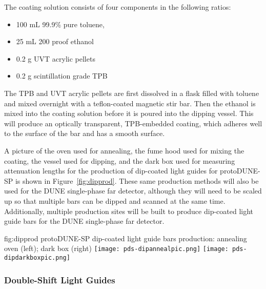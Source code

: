 The coating solution consists of four components in the following ratios:

\begin{itemize}
\item 100 mL 99.9\% pure toluene,
\item 25 mL 200 proof ethanol
\item 0.2 g UVT acrylic pellets
\item 0.2 g scintillation grade TPB
\end{itemize}

The TPB and UVT acrylic pellets are first dissolved in a flask filled with toluene and mixed overnight with a teflon-coated magnetic stir bar.  Then the ethanol is mixed into the coating solution before it is poured into the dipping vessel.  This will produce an optically transparent, TPB-embedded coating, which adheres well to the surface of the bar and has a smooth surface.

A picture of the oven used for annealing, the fume hood used for mixing the coating, the vessel used for dipping, and the dark box used for measuring attenuation lengths for the production of dip-coated light guides for protoDUNE-SP is shown in Figure~\ref{fig:dipprod}.  These same production methods will also be used for the DUNE single-phase far detector, although they will need to be scaled up so that multiple bars can be dipped and scanned at the same time.  Additionally, multiple production sites will be built to produce dip-coated light guide bars for the DUNE single-phase far detector.

\begin{dunefigure}{fig:dipprod}
{protoDUNE-SP dip-coated light guide bars production: annealing oven (left); dark box (right)}
  \texttt{[image: pds-dipannealpic.png]}
  \texttt{[image: pds-dipdarkboxpic.png]}
\end{dunefigure}




\subsubsection{Double-Shift Light Guides}
\label{ssec:fdsp-pd-pc-prod-bar2}

